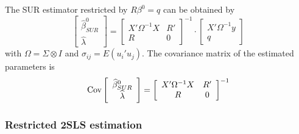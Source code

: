 The SUR estimator restricted by $R \beta^0 = q$ can be obtained by
\begin{equation}
   \left[ \begin{array}{c}
      \widehat{\beta}^0_{SUR} \\ \widehat{\lambda}
   \end{array} \right]
   =
   \left[ \begin{array}{cc}
      X' \Omega^{-1} X & R' \\ 
      R & 0
   \end{array} \right]^{-1}
   \cdot
   \left[ \begin{array}{c}
      X' \Omega^{-1} y \\ q 
   \end{array} \right]
\end{equation}
with $\Omega = \Sigma \otimes I$ and
$\sigma_{ij} = E \left( u_i' u_j \right)$.
The covariance matrix of the estimated parameters is
\begin{equation}
   \text{Cov} 
   \left[ \begin{array}{c}
      \widehat{\beta}^0_{SUR} \\ \widehat{\lambda}
   \end{array} \right] 
   = 
   \left[ \begin{array}{cc}
      X' \Omega^{-1} X & R' \\ 
      R & 0
   \end{array} \right]^{-1}
\end{equation}

\subsubsection{Restricted 2SLS estimation}

